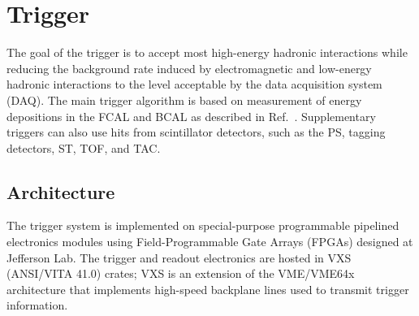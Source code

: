 
\section[Trigger]{Trigger \label{sec:trig}}
The goal of the \gx{} trigger is to accept most high-energy hadronic interactions while reducing the background rate induced by electromagnetic and low-energy hadronic interactions to the level acceptable 
by the data acquisition system (DAQ).  The main trigger algorithm is based on measurement of energy depositions in the FCAL and BCAL as described in Ref.~\cite{somov_l1,somov_l11}. Supplementary triggers can also use hits from scintillator detectors, such as the PS, tagging detectors, ST, TOF, and TAC.

\subsection{Architecture \label{sec:trigarchitecture}}
The \gx{} trigger system\cite{GlueX:2013twa} is implemented on special-purpose programmable pipelined electronics modules using Field-Programmable Gate Arrays (FPGAs) designed at Jefferson Lab.  The \gx{} trigger and readout electronics are hosted in VXS (ANSI/VITA 41.0) crates; VXS is an extension of the VME/VME64x architecture that implements high-speed backplane lines used to transmit trigger information. 

